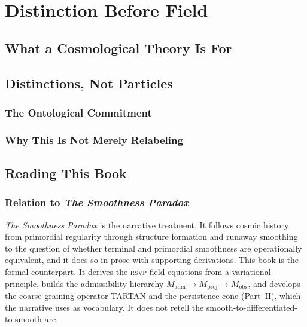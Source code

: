 \documentclass[12pt,a4paper,twoside,openright]{book}
\theoremstyle{plain}
\theoremstyle{definition}
\theoremstyle{remark}
\newcommand{\Mad}{M_{\mathrm{adm}}}
\newcommand{\Mproj}{M_{\mathrm{proj}}}
\newcommand{\Mobs}{M_{\mathrm{obs}}}
\newcommand{\RSVP}{\textsc{rsvp}}
\begin{document}
\chapter{Distinction Before Field}
\label{ch:distinction-before-field}


\section{What a Cosmological Theory Is For}

\section{Distinctions, Not Particles}

\subsection{The Ontological Commitment}
\subsection{Why This Is Not Merely Relabeling}

\section{Reading This Book}

\subsection{Relation to \emph{The Smoothness Paradox}}

\emph{The Smoothness Paradox} is the narrative treatment. It follows cosmic history from primordial regularity through structure formation and runaway smoothing to the question of whether terminal and primordial smoothness are operationally equivalent, and it does so in prose with supporting derivations. This book is the formal counterpart. It derives the \RSVP{} field equations from a variational principle, builds the admissibility hierarchy $\Mad \to \Mproj \to \Mobs$, and develops the coarse-graining operator TARTAN and the persistence cone (Part~II), which the narrative uses as vocabulary. It does not retell the smooth-to-differentiated-to-smooth arc.
\end{document}
